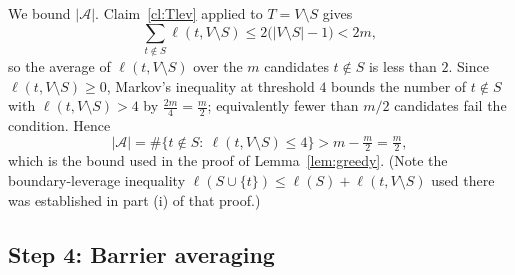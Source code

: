 We bound $|\mathcal{A}|$. Claim~\ref{cl:Tlev} applied to $T=V\setminus S$ gives
\[
  \sum_{t\notin S}\ell(t,V\setminus S)\le 2\bigl(|V\setminus S|-1\bigr)<2m,
\]
so the average of $\ell(t,V\setminus S)$ over the $m$ candidates $t\notin S$ is
less than $2$. Since $\ell(t,V\setminus S)\ge0$, Markov's inequality at
threshold $4$ bounds the number of $t\notin S$ with $\ell(t,V\setminus S)>4$ by
$\tfrac{2m}{4}=\tfrac{m}{2}$; equivalently fewer than $m/2$ candidates fail the
condition. Hence
\[
  |\mathcal{A}|=\#\{t\notin S:\ \ell(t,V\setminus S)\le4\}>m-\tfrac{m}{2}=\tfrac{m}{2},
\]
which is the bound used in the proof of Lemma~\ref{lem:greedy}. (Note the
boundary-leverage inequality $\ell(S\cup\{t\})\le\ell(S)+\ell(t,V\setminus S)$
used there was established in part (i) of that proof.)

\subsection*{Step 4: Barrier averaging}

